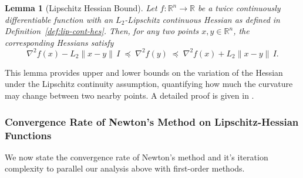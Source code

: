 \documentclass{article}
\theoremstyle{plain}
\newtheorem{lemma}[theorem]{Lemma}
\theoremstyle{definition}
\theoremstyle{remark}
\begin{document}
\begin{lemma}[Lipschitz Hessian Bound]
\label{lemma:lip-hes-bound}
Let $f:\mathbb{R}^n \to \mathbb{R}$ be a twice continuously differentiable 
function with an $L_2$-Lipschitz continuous Hessian as defined in 
Definition~\ref{def:lip-cont-hes}. Then, for any two points 
$x, y \in \mathbb{R}^n$, the corresponding Hessians satisfy
\[
\nabla^{2} f(x) - L_2 \|x - y\|\, I 
\;\preceq\; \nabla^{2} f(y) 
\;\preceq\; \nabla^{2} f(x) + L_2 \|x - y\|\, I.
\]
\end{lemma}
This lemma provides upper and lower bounds on the variation of the Hessian 
under the Lipschitz continuity assumption, quantifying how much the curvature 
may change between two nearby points. A detailed proof is given in 
\citet{zhang2023notes}.

\subsubsection{Convergence Rate of Newton’s Method on Lipschitz-Hessian Functions}

We now state the convergence rate of Newton's method and it's iteration complexity to parallel our analysis above with first-order methods.
\end{document}
